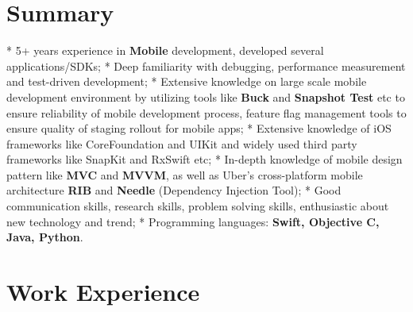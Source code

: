 \documentclass[10pt,letterpaper,sans]{moderncv}        %
\begin{document}
\makecvtitle



\vspace*{-1.3cm}
\section{Summary}
\cvitem{} {* 5+ years experience in \textbf{Mobile} development, developed several applications/SDKs;}
\cvitem{} {* Deep familiarity with debugging, performance measurement and test-driven development; }
\cvitem{} {* Extensive knowledge on large scale mobile development environment by utilizing tools like \textbf{Buck} and \textbf{Snapshot Test} etc to ensure reliability of mobile development process, feature flag management tools to ensure quality of staging rollout for mobile apps; }
\cvitem{} {* Extensive knowledge of iOS frameworks like CoreFoundation and UIKit and widely used third party frameworks like SnapKit and RxSwift etc;  }
\cvitem{} {* In-depth knowledge of mobile design pattern like \textbf{MVC} and \textbf{MVVM}, as well as Uber's cross-platform mobile architecture \textbf{RIB} and \textbf{Needle} (Dependency Injection Tool); }
\cvitem{} {* Good communication skills, research skills, problem solving skills, enthusiastic about new technology and trend; }
\cvitem{} {* Programming languages: \textbf{Swift, Objective C, Java, Python}.}

\section{Work Experience}
\end{document}
